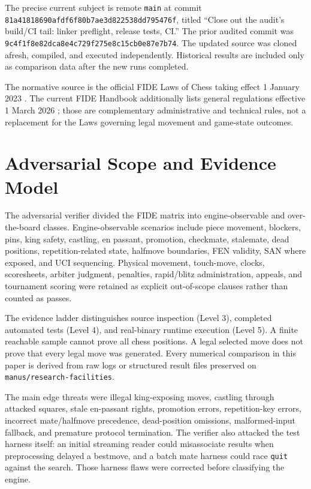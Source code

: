 \documentclass[conference]{IEEEtran}
\begin{document}
The precise current subject is remote \texttt{main} at commit \texttt{81a41818690afdf6f80b7ae3d822538dd795476f}, titled ``Close out the audit's build/CI tail: linker preflight, release tests, CI.'' The prior audited commit was \texttt{9c4f1f8e82dca8e4c729f275e8c15cb0e87e7b74}. The updated source was cloned afresh, compiled, and executed independently. Historical results are included only as comparison data after the new runs completed.

The normative source is the official FIDE Laws of Chess taking effect 1 January 2023 \cite{fide}. The current FIDE Handbook additionally lists general regulations effective 1 March 2026 \cite{general}; those are complementary administrative and technical rules, not a replacement for the Laws governing legal movement and game-state outcomes.

\section{Adversarial Scope and Evidence Model}
The adversarial verifier divided the FIDE matrix into engine-observable and over-the-board classes. Engine-observable scenarios include piece movement, blockers, pins, king safety, castling, en passant, promotion, checkmate, stalemate, dead positions, repetition-related state, halfmove boundaries, FEN validity, SAN where exposed, and UCI sequencing. Physical movement, touch-move, clocks, scoresheets, arbiter judgment, penalties, rapid/blitz administration, appeals, and tournament scoring were retained as explicit out-of-scope clauses rather than counted as passes.

The evidence ladder distinguishes source inspection (Level 3), completed automated tests (Level 4), and real-binary runtime execution (Level 5). A finite reachable sample cannot prove all chess positions. A legal selected move does not prove that every legal move was generated. Every numerical comparison in this paper is derived from raw logs or structured result files preserved on \texttt{manus/research-facilities}.

The main edge threats were illegal king-exposing moves, castling through attacked squares, stale en-passant rights, promotion errors, repetition-key errors, incorrect mate/halfmove precedence, dead-position omissions, malformed-input fallback, and premature protocol termination. The verifier also attacked the test harness itself: an initial streaming reader could misassociate results when preprocessing delayed a bestmove, and a batch mate harness could race \texttt{quit} against the search. Those harness flaws were corrected before classifying the engine.
\end{document}
